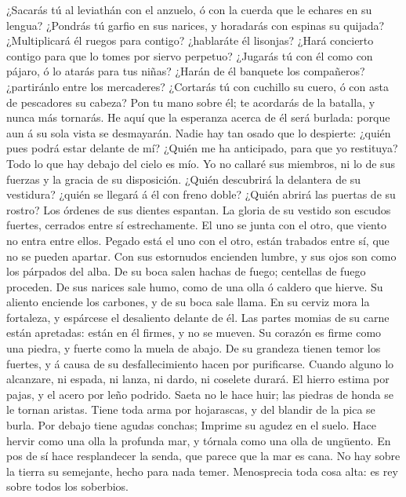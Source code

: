  ¿Sacarás tú al leviathán con el anzuelo, ó con la cuerda
que le echares en su lengua?  ¿Pondrás tú garfio en sus
narices, y horadarás con espinas su quijada? 
¿Multiplicará él ruegos para contigo? ¿hablaráte él lisonjas?
 ¿Hará concierto contigo para que lo tomes por siervo
perpetuo?  ¿Jugarás tú con él como con pájaro, ó lo atarás
para tus niñas?  ¿Harán de él banquete los compañeros?
¿partiránlo entre los mercaderes?  ¿Cortarás tú con
cuchillo su cuero, ó con asta de pescadores su cabeza? 
Pon tu mano sobre él; te acordarás de la batalla, y nunca más tornarás.
 He aquí que la esperanza acerca de él será burlada:
porque aun á su sola vista se desmayarán.  Nadie hay tan
osado que lo despierte: ¿quién pues podrá estar delante de mí?
 ¿Quién me ha anticipado, para que yo restituya? Todo lo
que hay debajo del cielo es mío.  Yo no callaré sus
miembros, ni lo de sus fuerzas y la gracia de su disposición.
 ¿Quién descubrirá la delantera de su vestidura? ¿quién
se llegará á él con freno doble?  ¿Quién abrirá las
puertas de su rostro? Los órdenes de sus dientes espantan.
 La gloria de su vestido son escudos fuertes, cerrados
entre sí estrechamente.  El uno se junta con el otro, que
viento no entra entre ellos.  Pegado está el uno con el
otro, están trabados entre sí, que no se pueden apartar. 
Con sus estornudos encienden lumbre, y sus ojos son como los párpados
del alba.  De su boca salen hachas de fuego; centellas de
fuego proceden.  De sus narices sale humo, como de una
olla ó caldero que hierve.  Su aliento enciende los
carbones, y de su boca sale llama.  En su cerviz mora la
fortaleza, y espárcese el desaliento delante de él.  Las
partes momias de su carne están apretadas: están en él firmes, y no se
mueven.  Su corazón es firme como una piedra, y fuerte
como la muela de abajo.  De su grandeza tienen temor los
fuertes, y á causa de su desfallecimiento hacen por purificarse.
 Cuando alguno lo alcanzare, ni espada, ni lanza, ni
dardo, ni coselete durará.  El hierro estima por pajas, y
el acero por leño podrido.  Saeta no le hace huir; las
piedras de honda se le tornan aristas.  Tiene toda arma
por hojarascas, y del blandir de la pica se burla.  Por
debajo tiene agudas conchas; Imprime su agudez en el suelo.
 Hace hervir como una olla la profunda mar, y tórnala
como una olla de ungüento.  En pos de sí hace
resplandecer la senda, que parece que la mar es cana.  No
hay sobre la tierra su semejante, hecho para nada temer. 
Menosprecia toda cosa alta: es rey sobre todos los soberbios.

